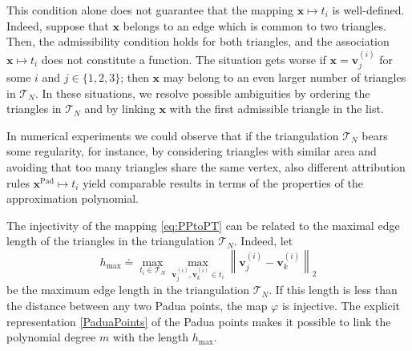 \documentclass{svjour3}
\newcommand{\T}{\mathcal{T}}
\begin{document}
This condition alone does not guarantee that the mapping $  \boldsymbol{x} \mapsto t_i $ is well-defined. Indeed, suppose that $ \boldsymbol{x} $ belongs to an edge which is common to two triangles. Then, the admissibility condition holds for both triangles, and the association $ \boldsymbol{x} \mapsto t_i $ does not constitute a function. The  situation gets worse if $ \boldsymbol{x} = \boldsymbol{v}_j^{(i)} $ for some $i$ and $ j \in \{1,2,3\}$; then $ \boldsymbol{x} $ may belong to an even larger number of triangles in $ \mathcal{T}_N$. In these situations, we resolve possible ambiguities by ordering the triangles in $ \mathcal{T}_N$ and by linking $ \boldsymbol{x} $ with the first admissible triangle in the list. 

\begin{remark}
In numerical experiments we could observe that if the triangulation $\T_N$ bears some regularity, for instance, by considering triangles with similar area and avoiding that too many triangles share the same vertex, also different attribution rules $ \boldsymbol{x}^{\mathrm{Pad}} \mapsto t_i $ yield comparable results in terms of the properties of the approximation polynomial.  
\end{remark}



The injectivity of the mapping \eqref{eq:PPtoPT} can be related to the maximal edge length of the triangles in the triangulation $\mathcal{T}_N$. Indeed, let
$$ h_{\max} \doteq \max_{t_i \in \mathcal{T}_N} \max_{\boldsymbol{v}_j^{(i)}, \boldsymbol{v}_k^{(i)} \in t_i} \left\lVert \boldsymbol{v}_j^{(i)} - \boldsymbol{v}_k^{(i)} \right\rVert_2 $$
be the maximum edge length in the triangulation $ \mathcal{T}_N$. If this length is less than the distance between any two Padua points, the map $ \varphi $ is injective. The explicit representation \eqref{PaduaPoints} of the Padua points makes it possible to link the polynomial degree $ m $ with the length $ h_{\max} $.
\end{document}
